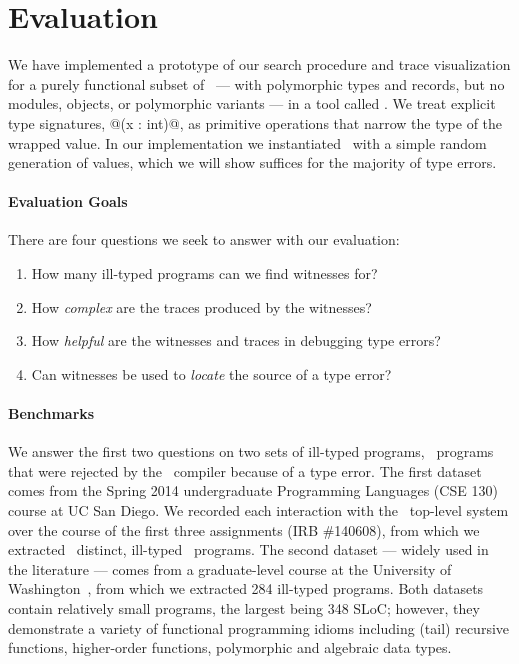 \section{Evaluation}
\label{sec:evaluation}

We have implemented a prototype of our search procedure and trace
visualization for a purely functional subset of \ocaml\ --- with
polymorphic types and records, but no modules, objects, or polymorphic
variants --- in a tool called \nanomaly.
%
We treat explicit type signatures, \eg @(x : int)@, as
primitive operations that narrow the type of the wrapped value.
%
In our implementation we instantiated \gensym\ with a simple random
generation of values, which we will show suffices for the majority of
type errors.

\paragraph{Evaluation Goals}
%
There are four questions we seek to answer with our evaluation:
%
\begin{enumerate}
\item {}
      How many ill-typed programs can we find witnesses for?
\item {}
      How \emph{complex} are the traces produced by the witnesses?
\item {}
      How \emph{helpful} %
      are the witnesses and traces in debugging type errors?
\item {}
      Can witnesses be used to \emph{locate} the source
      of a type error?
\end{enumerate}

\paragraph{Benchmarks}
We answer the first two questions on two sets of ill-typed programs,
\ie\ programs that were rejected by the \ocaml\ compiler because of a
type error.
%
The first dataset comes from the Spring 2014 undergraduate Programming
Languages (CSE 130) course at UC San Diego.
%
We recorded each interaction with the \ocaml\ top-level system over the
course of the first three assignments (IRB
\#140608),
from which we extracted \ucsdsize\ distinct, ill-typed \ocaml\ programs.
%
The second dataset --- widely used in the literature --- comes from a
graduate-level course at the University of Washington~\cite{Lerner2006-pj},
from which we extracted 284 ill-typed programs.
%
Both datasets contain relatively small programs, the largest being 348
SLoC; however, they demonstrate a variety of functional programming
idioms including (tail) recursive functions, higher-order functions,
polymorphic and algebraic data types. %

